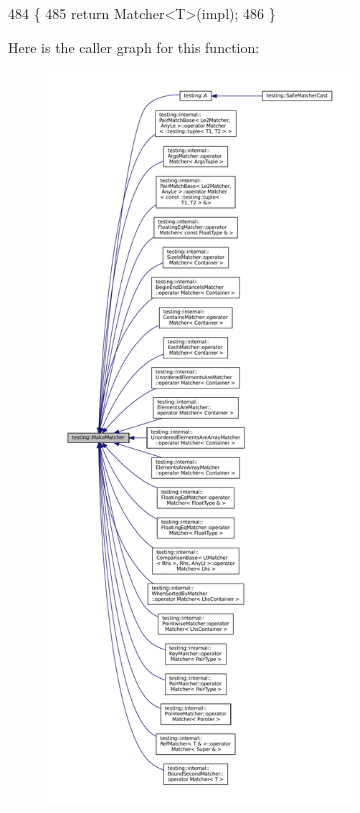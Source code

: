\begin{DoxyCode}
484                                                                \{
485   \textcolor{keywordflow}{return} Matcher<T>(impl);
486 \}
\end{DoxyCode}
Here is the caller graph for this function\+:
\nopagebreak
\begin{figure}[H]
\begin{center}
\leavevmode
\includegraphics[height=550pt]{namespacetesting_a37fd8029ac00e60952440a3d9cca8166_icgraph}
\end{center}
\end{figure}
\mbox{\label{namespacetesting_a36bd06c5ea972c6df0bd9f40a7a94c65}} 
